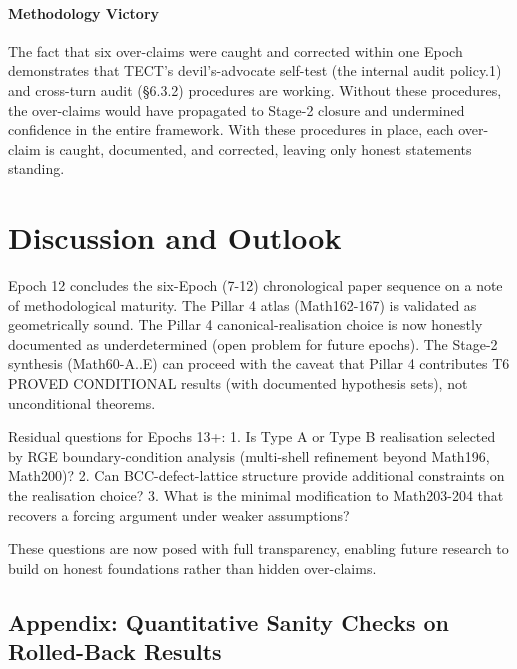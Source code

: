 \paragraph{Methodology Victory}

The fact that six over-claims were caught and corrected within one Epoch
demonstrates that TECT's devil's-advocate self-test (the internal audit policy.1) and
cross-turn audit (§6.3.2) procedures are working. Without these procedures, the
over-claims would have propagated to Stage-2 closure and undermined confidence
in the entire framework. With these procedures in place, each over-claim is caught,
documented, and corrected, leaving only honest statements standing.

\section{Discussion and Outlook}
Epoch 12 concludes the six-Epoch (7-12) chronological paper sequence on a note of
methodological maturity. The Pillar 4 atlas (Math162-167) is validated as
geometrically sound. The Pillar 4 canonical-realisation choice is now honestly
documented as underdetermined (open problem for future epochs). The Stage-2
synthesis (Math60-A..E) can proceed with the caveat that Pillar 4 contributes
T6 PROVED CONDITIONAL results (with documented hypothesis sets), not unconditional
theorems.

Residual questions for Epochs 13+:
1. Is Type A or Type B realisation selected by RGE boundary-condition analysis
   (multi-shell refinement beyond Math196, Math200)?
2. Can BCC-defect-lattice structure provide additional constraints on the
   realisation choice?
3. What is the minimal modification to Math203-204 that recovers a forcing
   argument under weaker assumptions?

These questions are now posed with full transparency, enabling future research
to build on honest foundations rather than hidden over-claims.

\subsection{Appendix: Quantitative Sanity Checks on Rolled-Back Results}

